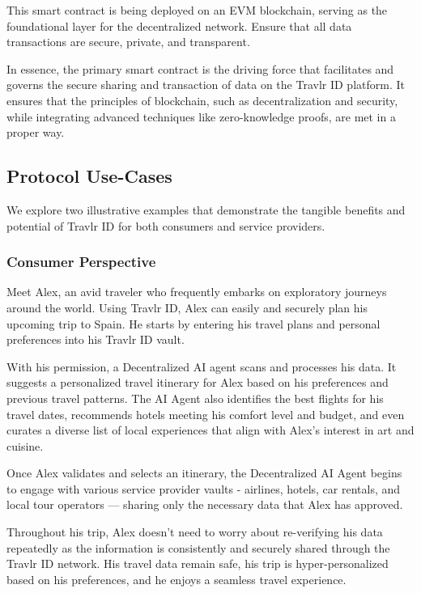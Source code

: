 \documentclass{article}
\begin{document}
This smart contract is being deployed on an EVM blockchain, serving as the foundational layer for the decentralized network. Ensure that all data transactions are secure, private, and transparent.

In essence, the primary smart contract is the driving force that facilitates and governs the secure sharing and transaction of data on the Travlr ID platform. It ensures that the principles of blockchain, such as decentralization and security, while integrating advanced techniques like zero-knowledge proofs, are met in a proper way.

\subsection{Protocol Use-Cases}

We explore two illustrative examples that demonstrate the tangible benefits and potential of Travlr ID for both consumers and service providers.

\subsubsection{Consumer Perspective}

Meet Alex, an avid traveler who frequently embarks on exploratory journeys around the world. Using Travlr ID, Alex can easily and securely plan his upcoming trip to Spain. He starts by entering his travel plans and personal preferences into his Travlr ID vault.

With his permission, a Decentralized AI agent scans and processes his data. It suggests a personalized travel itinerary for Alex based on his preferences and previous travel patterns. The AI Agent also identifies the best flights for his travel dates, recommends hotels meeting his comfort level and budget, and even curates a diverse list of local experiences that align with Alex's interest in art and cuisine.

Once Alex validates and selects an itinerary, the Decentralized AI Agent begins to engage with various service provider vaults - airlines, hotels, car rentals, and local tour operators — sharing only the necessary data that Alex has approved.

Throughout his trip, Alex doesn't need to worry about re-verifying his data repeatedly as the information is consistently and securely shared through the Travlr ID network. His travel data remain safe, his trip is hyper-personalized based on his preferences, and he enjoys a seamless travel experience.
\end{document}
